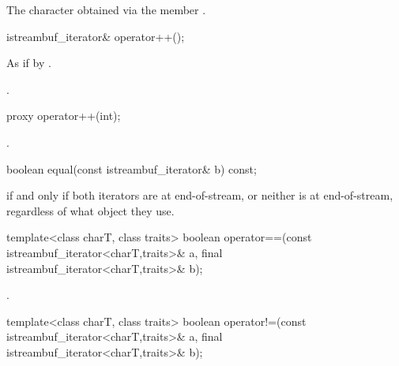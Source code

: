 \begin{itemdescr}
\pnum
\returns
The character obtained via the
member
.
\end{itemdescr}

%
\begin{itemdecl}
istreambuf_iterator& operator++();
\end{itemdecl}

\begin{itemdescr}
\pnum
\effects
As if by .

\pnum
\returns
{}.
\end{itemdescr}

%
\begin{itemdecl}
proxy operator++(int);
\end{itemdecl}

\begin{itemdescr}
\pnum
\returns
{}.
\end{itemdescr}

%
\begin{itemdecl}
boolean equal(const istreambuf_iterator& b) const;
\end{itemdecl}

\begin{itemdescr}
\pnum
\returns
{}
if and only if both iterators are at end-of-stream,
or neither is at end-of-stream, regardless of what
object they use.
\end{itemdescr}

%
\begin{itemdecl}
template<class charT, class traits>
  boolean operator==(const istreambuf_iterator<charT,traits>& a,
                  final istreambuf_iterator<charT,traits>& b);
\end{itemdecl}

\begin{itemdescr}
\pnum
\returns
{}.
\end{itemdescr}

%
\begin{itemdecl}
template<class charT, class traits>
  boolean operator!=(const istreambuf_iterator<charT,traits>& a,
                  final istreambuf_iterator<charT,traits>& b);
\end{itemdecl}

